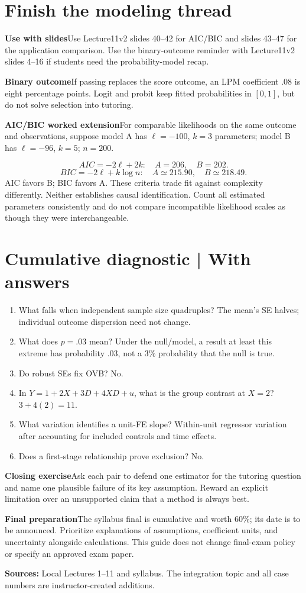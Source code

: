 \documentclass[11pt,a4paper]{article}
\newcommand{\heading}[1]{\section*{\color{accent}#1}}
\newcommand{\cue}[2]{\par\noindent\textbf{#1}\quad #2\par}
\begin{document}
\newpage
\heading{Finish the modeling thread}
\cue{Use with slides}{Use Lecture11v2 slides 40--42 for AIC/BIC and slides 43--47 for the application comparison. Use the binary-outcome reminder with Lecture11v2 slides 4--16 if students need the probability-model recap.}
\cue{Binary outcome}{If passing replaces the score outcome, an LPM coefficient $.08$ is eight percentage points. Logit and probit keep fitted probabilities in $[0,1]$, but do not solve selection into tutoring.}
\cue{AIC/BIC worked extension}{For comparable likelihoods on the same outcome and observations, suppose model A has $\ell=-100$, $k=3$ parameters; model B has $\ell=-96$, $k=5$; $n=200$.}
\[
AIC=-2\ell+2k:\quad A=206,\quad B=202.
\]
\[
BIC=-2\ell+k\log n:\quad A\simeq215.90,\quad B\simeq218.49.
\]
AIC favors B; BIC favors A. These criteria trade fit against complexity differently. Neither establishes causal identification. Count all estimated parameters consistently and do not compare incompatible likelihood scales as though they were interchangeable.
\heading{Cumulative diagnostic | With answers}
\begin{enumerate}
\item What falls when independent sample size quadruples? The mean's SE halves; individual outcome dispersion need not change.
\item What does $p=.03$ mean? Under the null/model, a result at least this extreme has probability $.03$, not a 3\% probability that the null is true.
\item Do robust SEs fix OVB? No.
\item In $Y=1+2X+3D+4XD+u$, what is the group contrast at $X=2$? $3+4(2)=11$.
\item What variation identifies a unit-FE slope? Within-unit regressor variation after accounting for included controls and time effects.
\item Does a first-stage relationship prove exclusion? No.
\end{enumerate}
\cue{Closing exercise}{Ask each pair to defend one estimator for the tutoring question and name one plausible failure of its key assumption. Reward an explicit limitation over an unsupported claim that a method is always best.}
\cue{Final preparation}{The syllabus final is cumulative and worth 60\%; its date is to be announced. Prioritize explanations of assumptions, coefficient units, and uncertainty alongside calculations. This guide does not change final-exam policy or specify an approved exam paper.}
\textbf{Sources:} Local Lectures 1--11 and syllabus. The integration topic and all case numbers are instructor-created additions.
\end{document}
